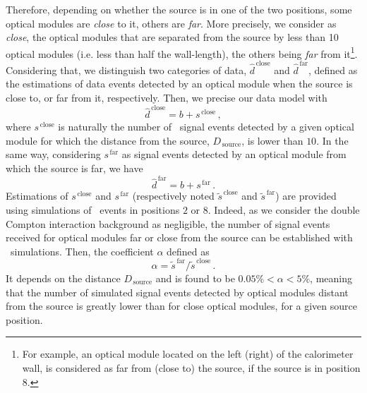 Therefore, depending on whether the source is in one of the two positions, some optical modules are \emph{close} to it, others are \emph{far}.
More precisely, we consider as \emph{close}, the optical modules that are separated from the source by less than 10 optical modules (i.e. less than half the wall-length), the others being \emph{far} from it\footnote{For example, an optical module located on the left (right) of the calorimeter wall, is considered as far from (close to) the source, if the source is in position $8$.}.
Considering that, we distinguish two categories of data, $\hat{d}^{\,\text{close}}$ and $\hat{d}^{\,\text{far}}$, defined as the estimations of data events detected by an optical module when the source is close to, or far from it, respectively.
Then, we precise our data model with
\begin{equation}
  \hat{d}^{\,\text{close}} = b + s^{\,\text{close}}\,,
  \label{eq:estimation_data_close}
\end{equation}
where $s^{\,\text{close}}$ is naturally the number of \Co\ signal events detected by a given optical module for which the distance from the source, $D_{\,\text{source}}$, is lower than $10$.
In the same way, considering $s^{\,\text{far}}$ as signal events detected by an optical module from which the source is far, we have
\begin{equation}
  \hat{d}^{\,\text{far}} = b + s^{\,\text{far}}\,.
  \label{eq:estimation_data_far}
\end{equation}
Estimations of $s^{\,\text{close}}$ and $s^{\,\text{far}}$ (respectively noted $\tilde{s}^{\,\text{close}}$ and $\tilde{s}^{\,\text{far}}$) are provided using simulations of \Co\ events in positions $2$ or $8$.
Indeed, as we consider the double Compton interaction background as negligible, the number of signal events received for optical modules far or close from the source can be established with \Co\ simulations.
Then, the coefficient $\alpha$ defined as
\begin{equation}
  \alpha = \tilde{s}^{\,\text{far}}/\tilde{s}^{\,\text{close}}\,.
\end{equation}
It depends on the distance $D_{\,\text{source}}$ and is found to be $0.05 \% < \alpha < 5 \%$, meaning that the number of simulated signal events detected by optical modules distant from the source is greatly lower than for close optical modules, for a given source position.

